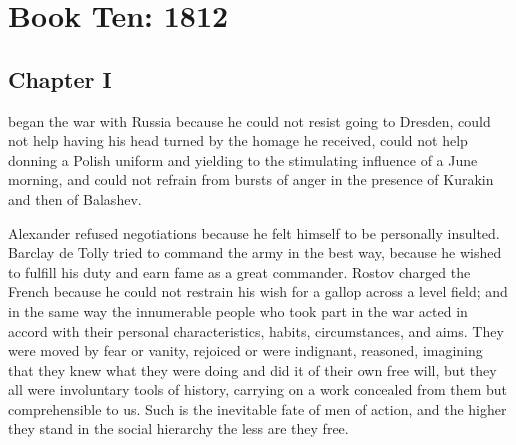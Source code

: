 \part*{Book Ten: 1812}


\chapter*{Chapter I} \ifaudio {}
\fi

 began the war with Russia because he could not resist
going to Dresden, could not help having his head turned by the
homage he received, could not help donning a Polish uniform and
yielding to the stimulating influence of a June morning, and
could not refrain from bursts of anger in the presence of Kurakin
and then of Balashev.

Alexander refused negotiations because he felt himself to be
personally insulted. Barclay de Tolly tried to command the army
in the best way, because he wished to fulfill his duty and earn
fame as a great commander. Rostov charged the French because he
could not restrain his wish for a gallop across a level field;
and in the same way the innumerable people who took part in the
war acted in accord with their personal characteristics, habits,
circumstances, and aims. They were moved by fear or vanity,
rejoiced or were indignant, reasoned, imagining that they knew
what they were doing and did it of their own free will, but they
all were involuntary tools of history, carrying on a work
concealed from them but comprehensible to us. Such is the
inevitable fate of men of action, and the higher they stand in
the social hierarchy the less are they free.


